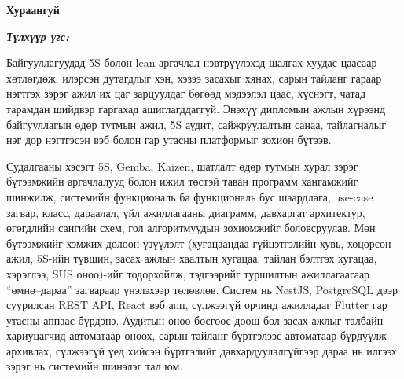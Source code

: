 

\begin{center}
{\scshape\Large \univname\par}
{\scshape\large \facname\par}\vspace{0.5cm}
{\huge\textbf{{Хураангуй}} \par}
\bigskip
{\Large{\ttitle} \par}
\bigskip

{\normalsize \shortname \par}\addressname

\end{center}

\textit{\textbf{Түлхүүр үгс: \keywordnames}}
\bigskip

Байгууллагуудад 5S болон lean аргачлал нэвтрүүлэхэд шалгах хуудас цаасаар хөтлөгдөж, илэрсэн дутагдлыг хэн, хэзээ засахыг хянах, сарын тайланг гараар нэгтгэх зэрэг ажил их цаг зарцуулдаг бөгөөд мэдээлэл цаас, хүснэгт, чатад тарамдан шийдвэр гаргахад ашиглагддаггүй. Энэхүү дипломын ажлын хүрээнд байгууллагын өдөр тутмын ажил, 5S аудит, сайжруулалтын санаа, тайлагналыг нэг дор нэгтгэсэн вэб болон гар утасны платформыг зохион бүтээв.

Судалгааны хэсэгт 5S, Gemba, Kaizen, шатлалт өдөр тутмын хурал зэрэг бүтээмжийн аргачлалууд болон ижил төстэй таван программ хангамжийг шинжилж, системийн функциональ ба функциональ бус шаардлага, use-case загвар, класс, дараалал, үйл ажиллагааны диаграмм, давхаргат архитектур, өгөгдлийн сангийн схем, гол алгоритмуудын зохиомжийг боловсруулав. Мөн бүтээмжийг хэмжих долоон үзүүлэлт (хугацаандаа гүйцэтгэлийн хувь, хоцорсон ажил, 5S-ийн түвшин, засах ажлын хаалтын хугацаа, тайлан бэлтгэх хугацаа, хэрэглээ, SUS оноо)-ийг тодорхойлж, тэдгээрийг туршилтын ажиллагаагаар ``өмнө--дараа'' загвараар үнэлэхээр төлөвлөв. Систем нь NestJS, PostgreSQL дээр суурилсан REST API, React вэб апп, сүлжээгүй орчинд ажилладаг Flutter гар утасны аппаас бүрдэнэ. Аудитын оноо босгоос доош бол засах ажлыг талбайн хариуцагчид автоматаар оноох, сарын тайланг бүртгэлээс автоматаар бүрдүүлж архивлах, сүлжээгүй үед хийсэн бүртгэлийг давхардуулалгүйгээр дараа нь илгээх зэрэг нь системийн шинэлэг тал юм.
